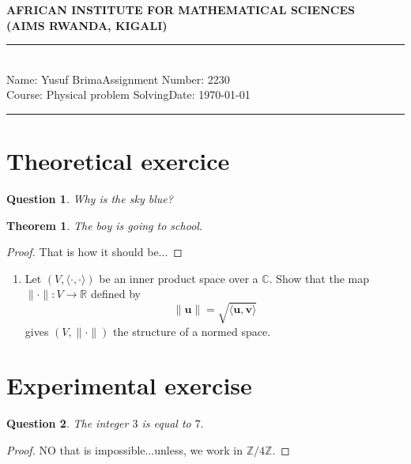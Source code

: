 \documentclass[12pt,a4paper]{article}
\newcommand{\student}{Yusuf Brima}
\newcommand{\course}{Physical problem Solving}
\newcommand{\assignment}{2230}
\newtheorem{thm}{Theorem}
\newtheorem{quest}{Question}[section]
\newcommand{\Z}{\mathbb{Z}}
\begin{document}
\thispagestyle{empty}
\begin{center}
\textbf{AFRICAN INSTITUTE FOR MATHEMATICAL SCIENCES \\[0.5cm]
(AIMS RWANDA, KIGALI)}
\vspace{1.0cm}
\end{center}

\noindent
\rule{17cm}{0.2cm}\\[0.3cm]
Name: \student \hfill Assignment Number: \assignment\\[0.1cm]
Course: \course \hfill Date: \today\\
\rule{17cm}{0.05cm}
\vspace{1.0cm}

\section{Theoretical exercice}

\begin{quest}

Why is the sky blue?

\end{quest}

\begin{thm}
The boy is going to school.
\end{thm}

\begin{proof}
That is how it should be...
\end{proof}

\begin{enumerate}
\item Let $(V,\langle \cdot,\cdot\rangle)$ be an inner product space over a $\mathbb{C}$. Show that the map $\|\cdot\|:V\rightarrow \mathbb{R}$ defined by 
$$\|\mathbf{u}\| = \sqrt{\langle \mathbf{u},\mathbf{v}\rangle}$$
gives $(V,\|\cdot\|)$ the structure of a normed space.
\end{enumerate}

\section{Experimental exercise }

\begin{quest}
The integer $3$ is equal to $7.$
\end{quest}

\begin{proof}
NO that is impossible...unless, we work in $\Z/4\Z.$
\end{proof}
\end{document}
